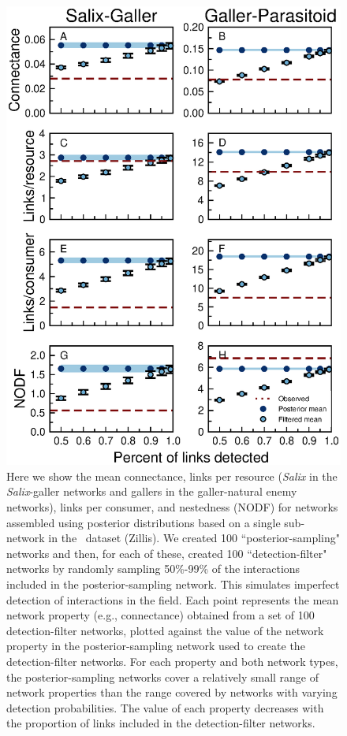 \documentclass[12pt]{article}
\begin{document}
  \begin{figure}[h!]
    \caption{Here we show the mean connectance, links per resource (\emph{Salix} in the \emph{Salix}-galler networks and gallers in the galler-natural enemy networks), links per consumer, and nestedness (NODF) for networks assembled using posterior distributions based on a single sub-network in the~\citet{Kopelke2017} dataset (Zillis). We created 100 ``posterior-sampling" networks and then, for each of these, created 100 ``detection-filter" networks by randomly sampling 50\%-99\% of the interactions included in the posterior-sampling network. This simulates imperfect detection of interactions in the field. Each point represents the mean network property (e.g., connectance) obtained from a set of 100 detection-filter networks, plotted against the value of the network property in the posterior-sampling network used to create the detection-filter networks. For each property and both network types, the posterior-sampling networks cover a relatively small range of network properties than the range covered by networks with varying detection probabilities. The value of each property decreases with the proportion of links included in the detection-filter networks.}
    \label{posterior_webs}    
    \begin{center}
    \includegraphics[width=.7\textwidth]{figures/Salix_Galler_posterior_properties_Zillis.eps}
    \end{center}
    \end{figure}


\clearpage

     
\end{document}
